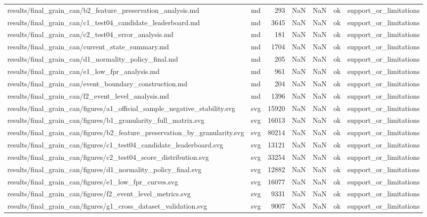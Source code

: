 \begin{tabular}{llrrrll}
results/final_grain_can/b2_feature_preservation_analysis.md & md & 293 & NaN & NaN & ok & support_or_limitations \\
results/final_grain_can/c1_test04_candidate_leaderboard.md & md & 3645 & NaN & NaN & ok & support_or_limitations \\
results/final_grain_can/c2_test04_error_analysis.md & md & 181 & NaN & NaN & ok & support_or_limitations \\
results/final_grain_can/current_state_summary.md & md & 1704 & NaN & NaN & ok & support_or_limitations \\
results/final_grain_can/d1_normality_policy_final.md & md & 205 & NaN & NaN & ok & support_or_limitations \\
results/final_grain_can/e1_low_fpr_analysis.md & md & 961 & NaN & NaN & ok & support_or_limitations \\
results/final_grain_can/event_boundary_construction.md & md & 204 & NaN & NaN & ok & support_or_limitations \\
results/final_grain_can/f2_event_level_analysis.md & md & 1396 & NaN & NaN & ok & support_or_limitations \\
results/final_grain_can/figures/a1_official_sample_negative_stability.svg & svg & 15920 & NaN & NaN & ok & support_or_limitations \\
results/final_grain_can/figures/b1_granularity_full_matrix.svg & svg & 16013 & NaN & NaN & ok & support_or_limitations \\
results/final_grain_can/figures/b2_feature_preservation_by_granularity.svg & svg & 80214 & NaN & NaN & ok & support_or_limitations \\
results/final_grain_can/figures/c1_test04_candidate_leaderboard.svg & svg & 13121 & NaN & NaN & ok & support_or_limitations \\
results/final_grain_can/figures/c2_test04_score_distribution.svg & svg & 33254 & NaN & NaN & ok & support_or_limitations \\
results/final_grain_can/figures/d1_normality_policy_final.svg & svg & 12882 & NaN & NaN & ok & support_or_limitations \\
results/final_grain_can/figures/e1_low_fpr_curves.svg & svg & 16077 & NaN & NaN & ok & support_or_limitations \\
results/final_grain_can/figures/f2_event_level_metrics.svg & svg & 9331 & NaN & NaN & ok & support_or_limitations \\
results/final_grain_can/figures/g1_cross_dataset_validation.svg & svg & 9007 & NaN & NaN & ok & support_or_limitations \\

\end{tabular}
